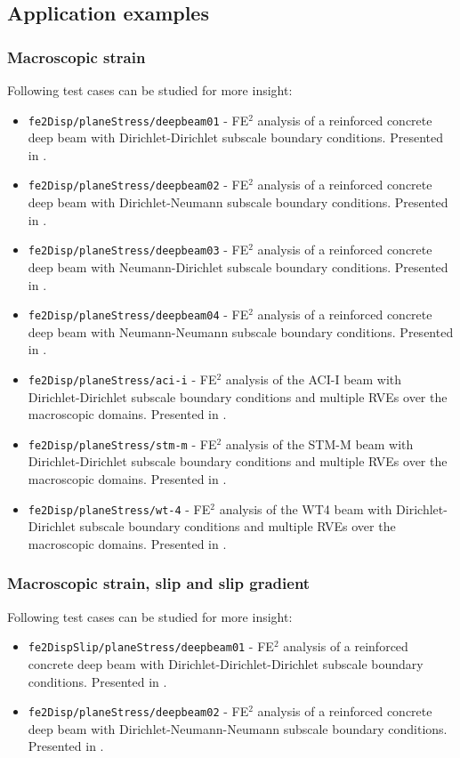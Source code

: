 \documentclass[11pt]{article}
\begin{document}
\subsection{Application examples}
\label{sec:fe2_applications}

\subsubsection{Macroscopic strain}

Following test cases can be studied for more insight:
\begin{itemize}
    \item \texttt{fe2Disp/planeStress/deepbeam01} - FE$^2$ analysis of a reinforced concrete deep beam with Dirichlet-Dirichlet subscale boundary conditions. Presented in \cite{PaperA}.
    \item \texttt{fe2Disp/planeStress/deepbeam02} - FE$^2$ analysis of a reinforced concrete deep beam with Dirichlet-Neumann subscale boundary conditions. Presented in \cite{PaperA}.
    \item \texttt{fe2Disp/planeStress/deepbeam03} - FE$^2$ analysis of a reinforced concrete deep beam with Neumann-Dirichlet subscale boundary conditions. Presented in \cite{PaperA}.
    \item \texttt{fe2Disp/planeStress/deepbeam04} - FE$^2$ analysis of a reinforced concrete deep beam with Neumann-Neumann subscale boundary conditions. Presented in \cite{PaperA}.
    \item \texttt{fe2Disp/planeStress/aci-i} - FE$^2$ analysis of the ACI-I beam with Dirichlet-Dirichlet subscale boundary conditions and multiple RVEs over the macroscopic domains. Presented in \cite{Sciegaj2019semc}.
    \item \texttt{fe2Disp/planeStress/stm-m} - FE$^2$ analysis of the STM-M beam with Dirichlet-Dirichlet subscale boundary conditions and multiple RVEs over the macroscopic domains. Presented in \cite{Sciegaj2019semc}.
    \item \texttt{fe2Disp/planeStress/wt-4} - FE$^2$ analysis of the WT4 beam with Dirichlet-Dirichlet subscale boundary conditions and multiple RVEs over the macroscopic domains. Presented in \cite{Sciegaj2019semc}.
\end{itemize}

\subsubsection{Macroscopic strain, slip and slip gradient}

Following test cases can be studied for more insight:
\begin{itemize}
    \item \texttt{fe2DispSlip/planeStress/deepbeam01} - FE$^2$ analysis of a reinforced concrete deep beam with Dirichlet-Dirichlet-Dirichlet subscale boundary conditions. Presented in \cite{PaperB}.
    \item \texttt{fe2Disp/planeStress/deepbeam02} - FE$^2$ analysis of a reinforced concrete deep beam with Dirichlet-Neumann-Neumann subscale boundary conditions. Presented in \cite{PaperC}.
\end{itemize}

\clearpage

\printbibliography
\end{document}
